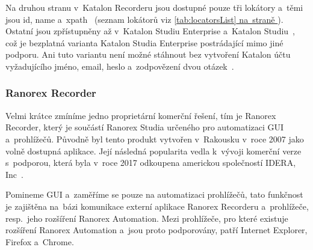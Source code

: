\documentclass[12pt, a4paper, twoside]{article}
\newcommand{\crefAddedText}[3]{\hyperref[#1]{#2\cref{#1}#3}}
\begin{document}
	Na druhou stranu v~Katalon Recorderu jsou dostupné pouze tři lokátory a~těmi jsou id, name a~xpath~\cite{katalonRecorderVsStudio} (seznam lokátorů viz \crefAddedText{tab:locatorsList}{}{ na~straně \pageref{tab:locatorsList}}). Ostatní jsou zpřístupněny až v~Katalon Studiu Enterprise a~Katalon Studiu~\cite{katalonRecorderVsStudio}, což je bezplatná varianta Katalon Studia Enterprise postrádající mimo jiné podporu. Ani tuto variantu není možné stáhnout bez vytvoření Katalon účtu vyžadujícího jméno, email, heslo a~zodpovězení dvou otázek~\cite{katalonPricing}.
	\newpage
    \subsubsection{Ranorex Recorder}
    Velmi krátce zmíníme jedno proprietární komerční řešení, tím je Ranorex Recorder, který je součástí Ranorex Studia určeného pro automatizaci GUI a~prohlížečů. Původně byl tento produkt vytvořen v~Rakousku v~roce 2007 jako volně dostupná aplikace. Její následná popularita vedla k~vývoji komerční verze s~podporou, která byla v~roce 2017 odkoupena americkou společností IDERA, Inc~\cite{ranorexAbout}.
    
    Pomineme GUI a~zaměříme se pouze na automatizaci prohlížečů, tato funkčnost je zajištěna na~bázi komunikace externí aplikace Ranorex Recorderu a~prohlížeče, resp.~jeho rozšíření Ranorex Automation. Mezi prohlížeče, pro které existuje rozšíření Ranorex Automation a~jsou proto podporovány, patří Internet Explorer, Firefox a~Chrome.
\end{document}
